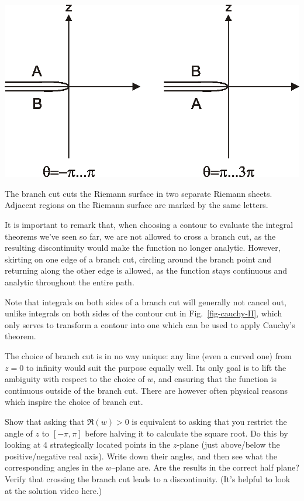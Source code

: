 \begin{marginfigure}[-2cm]
\centering
\includegraphics{complex/figures/sheets}
\caption{The branch cut cuts the Riemann surface in two separate Riemann sheets.
Adjacent regions on the Riemann surface are marked by the same letters.}
\label{fig-sheets}
\end{marginfigure}
It is important to remark that, when choosing a contour to evaluate the integral theorems we've seen so far, we are not allowed to cross a branch cut, as the resulting discontinuity would make the function no longer analytic. However, skirting on one edge of a branch cut, circling around the branch point and returning along the other edge is allowed, as the function stays continuous and analytic throughout the entire path. 

Note that integrals on both sides of a branch cut will generally not cancel out, unlike integrals on both sides of the contour cut in Fig.~\ref{fig-cauchy-II}, which only serves to transform a contour into one which can be used to apply Cauchy's theorem.

\noindent{}The choice of branch cut is in no way unique: any line (even a curved one) from $z=0$ to infinity would suit the purpose equally well. Its only goal is to lift the ambiguity with respect to the choice of $w$, and ensuring that the function is continuous outside of the branch cut. There are however often physical reasons which inspire the choice of branch cut.

\begin{exer}
\label{ex-branch-ang}
Show that asking that $\Re(w)>0$ is equivalent to asking that you restrict the angle of $z$ to $[-\pi, \pi]$ before halving it to calculate the square root. Do this by looking at 4 strategically located points in the $z$-plane (just above/below the positive/negative real axis). Write down their angles, and then see what the corresponding angles in the $w$--plane are. Are the results in the correct half plane? Verify that crossing the branch cut leads to a discontinuity. (It's helpful to look at the solution video here.)
\end{exer}

